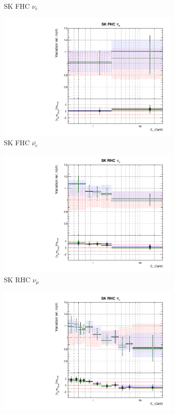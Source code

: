 \begin{figure}
\begin{subfigure}{0.24\textwidth}
  \caption{SK FHC $\nu_e$}
\end{subfigure}
\begin{subfigure}{0.24\textwidth}
  \centering
  \includegraphics[width=0.95\linewidth]{figs/polydataflux_11}
  \caption{SK FHC $\bar{\nu_{e}}$}
\end{subfigure}
\begin{subfigure}{0.24\textwidth}
  \centering
  \includegraphics[width=0.95\linewidth]{figs/polydataflux_12}
  \caption{SK RHC $\nu_{\mu}$}
\end{subfigure}
\begin{subfigure}{0.24\textwidth}
  \centering
  \includegraphics[width=0.95\linewidth]{figs/polydataflux_13}

\end{subfigure}
\end{figure}
